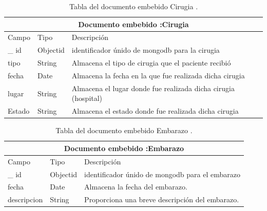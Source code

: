 	\begin{table}[htb]
	\centering
	\begin{tabular}{| p{3.5cm}| p{3.0cm} | p{9.8cm} |}
	\hline
	\multicolumn{3}{|c|}{Documento embebido :Cirugia} \\
	\hline
	Campo & Tipo &  Descripción\\ \hline
	
	\_ id & Objectid &identificador únido de mongodb para la cirugia \\ \hline
	
	tipo & String & Almacena el tipo de cirugia que el paciente recibió \\ \hline
	
	fecha & Date & Almacena la fecha en la que fue realizada dicha cirugia \\ \hline
	
	lugar & String & Almacena el lugar donde fue realizada dicha cirugia (hospital) \\ \hline
	
		
	Estado & String & Almacena el estado donde fue realizada dicha cirugia \\ \hline
	

	\end{tabular}
	\caption{Tabla del documento embebido Cirugia .}
	\label{tabla:diccionarioDatos}
	\end{table}


	\begin{table}[htb]
	\centering
	\begin{tabular}{| p{3.5cm}| p{3.0cm} | p{9.8cm} |}
	\hline
	\multicolumn{3}{|c|}{Documento embebido :Embarazo} \\
	\hline
	Campo & Tipo &  Descripción\\ \hline
	
	\_ id & Objectid &identificador únido de mongodb para el embarazo \\ \hline
	
	fecha & Date & Almacena la fecha del embarazo.
	\\ \hline
	descripcion & String & Proporciona una breve descripción del embarazo. 

	\end{tabular}
	\caption{Tabla del documento embebido Embarazo .}
	\label{tabla:diccionarioDatos}
	\end{table}
	

